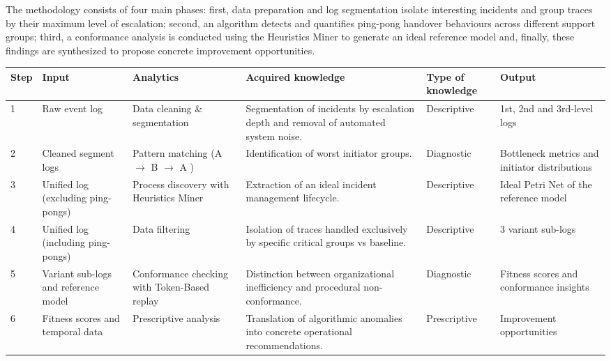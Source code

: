 \documentclass[11pt,a4paper]{article}
\begin{document}
The methodology consists of four main phases: first, data preparation and log segmentation isolate interesting incidents and group traces by their maximum level of escalation; second, an algorithm detects and quantifies ping-pong handover behaviours across different support groups; third, a conformance analysis is conducted using the Heuristics Miner to generate an ideal reference model and, finally, these findings are synthesized to propose concrete improvement opportunities.


\begin{table}[H]
    \centering
    \renewcommand{\arraystretch}{1.3} %
    \small %
    \begin{tabular}{|p{0.7cm}|p{2.5cm}|p{2.8cm}|p{3.5cm}|p{2cm}|p{1.8cm}|}
        \hline
        \textbf{Step} & \textbf{Input} & \textbf{Analytics} & \textbf{Acquired knowledge} & \textbf{Type of knowledge} & \textbf{Output} \\
        \hline
        1 & Raw event log & Data cleaning \& segmentation & Segmentation of incidents by escalation depth and removal of automated system noise. & Descriptive & 1st, 2nd and 3rd-level logs \\
        \hline
        2 & Cleaned segment logs & Pattern matching (A $\rightarrow$ B $\rightarrow$ A ) & Identification of worst initiator groups. & Diagnostic & Bottleneck metrics and initiator distributions \\
        \hline
        3 & Unified log (excluding ping-pongs) & Process discovery with Heuristics Miner & Extraction of an ideal incident management lifecycle. & Descriptive & Ideal Petri Net of the reference model \\
        \hline
        4 & Unified log (including ping-pongs) & Data filtering & Isolation of traces handled exclusively by specific critical groups vs baseline. & Descriptive & 3 variant sub-logs \\
        \hline
        5 & Variant sub-logs and reference model & Conformance checking with Token-Based replay & Distinction between organizational inefficiency and procedural non-conformance. & Diagnostic & Fitness scores and conformance insights \\
        \hline
        6 & Fitness scores and temporal data & Prescriptive analysis & Translation of algorithmic anomalies into concrete operational recommendations. & Prescriptive & Improvement opportunities \\
        \hline
    \end{tabular}
\end{table}
\end{document}
